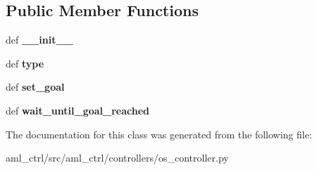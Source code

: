\subsection*{Public Member Functions}
\begin{DoxyCompactItemize}
\item 
\hypertarget{classaml__ctrl_1_1controllers_1_1os__controller_1_1_o_s_controller_a45df7c8506ac273fa1fa4151d150bce6}{def {\bfseries \-\_\-\-\_\-init\-\_\-\-\_\-}}\label{classaml__ctrl_1_1controllers_1_1os__controller_1_1_o_s_controller_a45df7c8506ac273fa1fa4151d150bce6}

\item 
\hypertarget{classaml__ctrl_1_1controllers_1_1os__controller_1_1_o_s_controller_abfe6dd54b6461dfeedfec2d38c77f471}{def {\bfseries type}}\label{classaml__ctrl_1_1controllers_1_1os__controller_1_1_o_s_controller_abfe6dd54b6461dfeedfec2d38c77f471}

\item 
\hypertarget{classaml__ctrl_1_1controllers_1_1os__controller_1_1_o_s_controller_ac69f3c28e16ac763aa1368b8d8fb08ae}{def {\bfseries set\-\_\-goal}}\label{classaml__ctrl_1_1controllers_1_1os__controller_1_1_o_s_controller_ac69f3c28e16ac763aa1368b8d8fb08ae}

\item 
\hypertarget{classaml__ctrl_1_1controllers_1_1os__controller_1_1_o_s_controller_afbb13642219c803856fb69f8104e97fe}{def {\bfseries wait\-\_\-until\-\_\-goal\-\_\-reached}}\label{classaml__ctrl_1_1controllers_1_1os__controller_1_1_o_s_controller_afbb13642219c803856fb69f8104e97fe}

\end{DoxyCompactItemize}


The documentation for this class was generated from the following file\-:\begin{DoxyCompactItemize}
\item 
aml\-\_\-ctrl/src/aml\-\_\-ctrl/controllers/os\-\_\-controller.\-py\end{DoxyCompactItemize}

